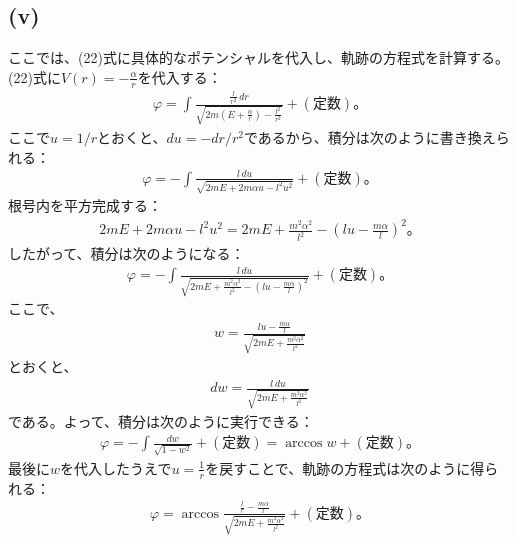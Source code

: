   \subsection*{(v)}
  ここでは、(22)式に具体的なポテンシャルを代入し、軌跡の方程式を計算する。\\
  (22)式に$V(r)=-\frac{\alpha}{r}$を代入する：
  \begin{align*}
    \varphi=\int \frac{\frac{l}{r^2}\,dr}{\sqrt{2m\left(E+\frac{\alpha}{r}\right)-\frac{l^2}{r^2}}}+(定数)。
  \end{align*}
  ここで$u=1/r$とおくと、$du=-dr/r^2$であるから、積分は次のように書き換えられる：
  \begin{align*}
    \varphi=-\int\frac{l\,du}{\sqrt{2mE+2m\alpha u-l^2u^2}}+(定数)。
  \end{align*}
  根号内を平方完成する：
  \begin{align*}
    2mE+2m\alpha u-l^2u^2=2mE+\frac{m^2\alpha^2}{l^2}-\left(lu-\frac{m\alpha}{l}\right)^2。
  \end{align*}
  したがって、積分は次のようになる：
  \begin{align*}
    \varphi=-\int\frac{l\,du}{\sqrt{2mE+\frac{m^2\alpha^2}{l^2}-\left(lu-\frac{m\alpha}{l}\right)^2}}+(定数)。
  \end{align*}
  ここで、
  \begin{align*}
    w=\frac{lu-\frac{m\alpha}{l}}{\sqrt{2mE+\frac{m^2\alpha^2}{l^2}}}
  \end{align*}
  とおくと、
  \begin{align*}
    dw=\frac{l\,du}{\sqrt{2mE+\frac{m^2\alpha^2}{l^2}}}
  \end{align*}
  である。よって、積分は次のように実行できる：
  \begin{align*}
    \varphi=-\int\frac{dw}{\sqrt{1-w^2}}+(定数)=\arccos w+(定数)。
  \end{align*}
  最後に$w$を代入したうえで$u=\frac1r$を戻すことで、軌跡の方程式は次のように得られる：
  \begin{align*}
    \varphi=\arccos\frac{\frac{l}{r}-\frac{m\alpha}{l}}{\sqrt{2mE+\frac{m^2\alpha^2}{l^2}}}+(定数)。\tag{31}
  \end{align*}

